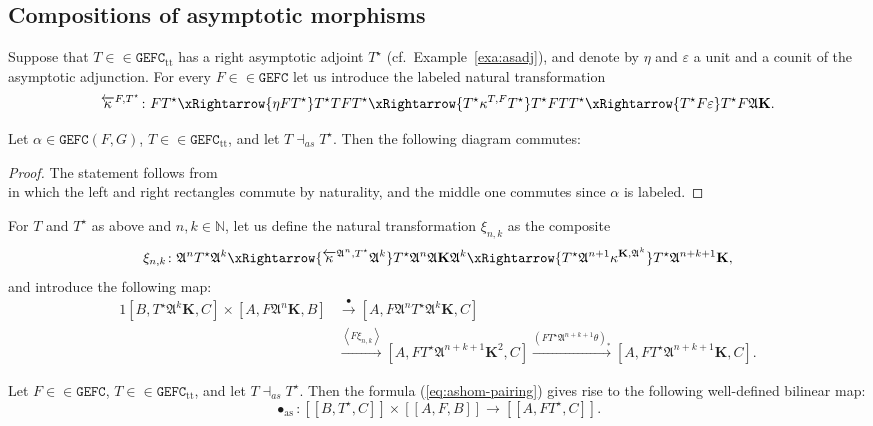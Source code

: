 \documentclass[10pt]{simplearticle}
\newcommand{\tikzinput}[1]{}
\newcommand{\as}{\operatorname{as}}
\newcommand{\GEFC}{\mathbb{\mathtt{GEFC}}}
\newcommand{\asadj}{\dashv_{as}}
\newcommand{\fK}{\mathbf{K}}
\newcommand{\ttt}{\operatorname{tt}}
\newcommand{\kapparev}{\overleftarrow{\kappa}}
\newcommand{\myllbracket}{[[}
\newcommand{\myrrbracket}{]]}
\newcommand{\bbrackets}[1]{\myllbracket#1\myrrbracket}
\begin{document}
\subsection{Compositions of asymptotic morphisms}

Suppose that $T\in\in\GEFC_{\ttt}$ has a right asymptotic adjoint
$T^{\star}$
(cf.~Example~\ref{exa:asadj}), and
denote by $\eta$ and $\varepsilon$ a unit and a counit of the asymptotic
adjunction. For every $F\in\in\GEFC$ let us introduce the labeled
natural transformation
\[
\kapparev^{F,T^{\star}}\colon FT^{\star}\xRightarrow{\eta FT^{\star}}T^{\star}TFT^{\star}\xRightarrow{T^{\star}\kappa^{T,F}T^{\star}}T^{\star}FTT^{\star}\xRightarrow{T^{\star}F\varepsilon}T^{\star}F\mathfrak{A}\fK.
\]

\begin{lem}\label{lem:kapparev}
Let $\alpha\in\GEFC(F,G)$, $T\in\in\GEFC_{\ttt}$,
and let $T\asadj T^{\star}$. Then the following diagram commutes:
\[
\tikzinput{d426}
\]
\end{lem}

\begin{proof}
The statement follows from
\[
\tikzinput{d427}
\]
in which the left and right rectangles commute by naturality, and
the middle one commutes since $\alpha$ is labeled.
\end{proof}

For $T$ and $T^{\star}$ as above and $n,k\in\mathbb{N}$, let us
define the natural transformation $\xi_{n,k}$ as the composite
\[
\xi_{n,k}\colon\mathfrak{A}^{n}T^{\star}\mathfrak{A}^{k}\xRightarrow{\kapparev^{\mathfrak{A}^{n},T^{\star}}\mathfrak{A}^{k}}T^{\star}\mathfrak{A}^{n}\mathfrak{A}\fK\mathfrak{A}^{k}\xRightarrow{T^{\star}\mathfrak{A}^{n+1}\kappa^{\fK,\mathfrak{A}^{k}}}T^{\star}\mathfrak{A}^{n+k+1}\fK,
\]
and introduce the following
map:
\begin{alignat}{1}
[B,T^{\star}\mathfrak{A}^{k}\fK,C]\times[A,F\mathfrak{A}^{n}\fK,B] & \xrightarrow{\bullet}[A,F\mathfrak{A}^{n}T^{\star}\mathfrak{A}^{k}\fK,C]\label{eq:ashom-pairing}\\
 & \xrightarrow{\left\langle F\xi_{n,k}\right\rangle }[A,FT^{\star}\mathfrak{A}^{n+k+1}\fK^{2},C]\xrightarrow{(FT^{\star}\mathfrak{A}^{n+k+1}\theta)_{*}}[A,FT^{\star}\mathfrak{A}^{n+k+1}\fK,C].\nonumber
\end{alignat}

\begin{prop}\label{prop:518}
Let
$F\in\in\GEFC$, $T\in\in\GEFC_{\ttt}$,
and let $T\asadj T^{\star}$. Then the formula (\ref{eq:ashom-pairing})
gives rise to the following well-defined bilinear map:
\[
\bullet_{\as}\colon\bbrackets{B,T^{\star},C}\times\bbrackets{A,F,B}\to\bbrackets{A,FT^{\star},C}.
\]
\end{prop}
\end{document}
